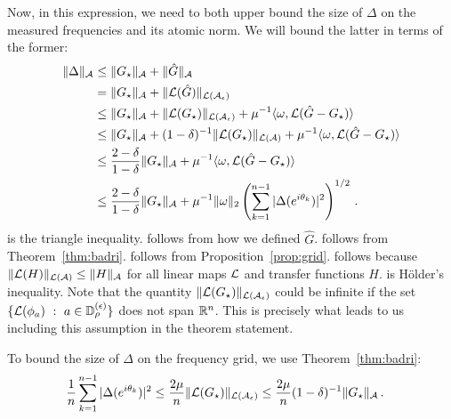 Now, in this expression, we need to both upper bound the size of $\Delta$ on the measured frequencies and its atomic norm.  We will bound the latter in terms of the former:
\begin{subequations}
\begin{align}
\label{eq:tri-ineq3}	\|\Delta\|_{\mathcal{A}} &\leq \| G_\star\|_{\mathcal{A}}+\|\hat{G}\|_{\mathcal{A}}\\
\label{eq:Ghat-def}	& = \|G_\star\|_{\mathcal{A}} + \|\mathcal{L}(\hat{G})\|_{\mathcal{L}(\mathcal{A}_\epsilon)}\\
\label{eq:apply-dast-cond}	& \leq \|G_\star\|_{\mathcal{A}} + \|\mathcal{L}(G_\star)\|_{\mathcal{L}(\mathcal{A}_\epsilon)} + \mu^{-1} \langle \omega, \mathcal{L}(\hat{G}-G_{\star})\rangle \\
\label{eq:apply-grid-prop}	& \leq \|G_\star\|_{\mathcal{A}} + (1-\delta)^{-1}\| \mathcal{L}(G_\star)\|_{\mathcal{L}(\mathcal{A})} + \mu^{-1} \langle \omega, \mathcal{L}(\hat{G}-G_{\star})\rangle \\
\label{eq:inf-domination}		& \leq \frac{2-\delta}{1-\delta} \|G_\star\|_{\mathcal{A}}  + \mu^{-1} \langle \omega, \mathcal{L}(\hat{G}-G_{\star})\rangle \\
\label{eq:holder-mf}		& \leq \frac{2-\delta}{1-\delta} \|G_\star\|_{\mathcal{A}}  + \mu^{-1} \| \omega\|_2 \left(\sum_{k=1}^{n-1} |\Delta(e^{i\theta_k})|^2\right)^{1/2} \,.
\end{align}
\end{subequations}
 is the triangle inequality.  follows from how we defined $\hat{G}$.   follows from Theorem~\ref{thm:badri}.   follows from Proposition~\ref{prop:grid}.   follows because $\|\mathcal{L}(H)\|_{\mathcal{L}(\mathcal{A})} \leq \|H\|_{\mathcal{A}}$ for all linear maps $\mathcal{L}$ and transfer functions $H$.   is H\"{older}'s inequality.  Note that the quantity $\|\mathcal{L}(G_\star)\|_{\mathcal{L}(\mathcal{A}_\epsilon)}$ could be infinite if the set $\{\mathcal{L}(\phi_a)~:~a\in \mathbb{D}_{\rho}^{(\epsilon)}\}$ does not span $\mathbb{R}^n$.  This is precisely what leads to us including this assumption in the theorem statement.

To bound the size of $\Delta$ on the frequency grid, we use Theorem~\ref{thm:badri}:
\begin{align*}
	\frac{1}{n}\sum_{k=1}^{n-1} |\Delta(e^{i\theta_k})|^2  &\leq \frac{2\mu}{n} \|\mathcal{L}(G_\star)\|_{\mathcal{L}(\mathcal{A}_\epsilon)}
	\leq \frac{2\mu}{n} (1-\delta)^{-1}\|G_\star\|_{\mathcal{A}}	\,.
\end{align*}


